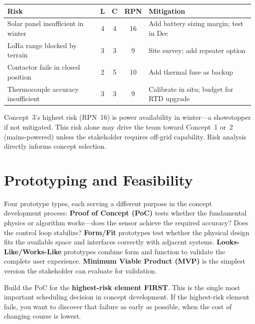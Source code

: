 \documentclass[11pt,letterpaper,twoside,openany]{book}
\begin{document}
\begin{keyconceptbox}
\begin{center}
\small
\begin{tabularx}{\textwidth}{X c c c l}
\toprule
\textbf{Risk} & \textbf{L} & \textbf{C} & \textbf{RPN} & \textbf{Mitigation} \\
\midrule
Solar panel insufficient in winter & 4 & 4 & 16 & Add battery sizing margin; test in Dec \\
LoRa range blocked by terrain & 3 & 3 & 9 & Site survey; add repeater option \\
Contactor fails in closed position & 2 & 5 & 10 & Add thermal fuse as backup \\
Thermocouple accuracy insufficient & 3 & 3 & 9 & Calibrate in situ; budget for RTD upgrade \\
\bottomrule
\end{tabularx}
\end{center}

Concept~3's highest risk (RPN~16) is power availability in winter---a showstopper if not mitigated. This risk alone may drive the team toward Concept~1 or~2 (mains-powered) unless the stakeholder requires off-grid capability. Risk analysis directly informs concept selection.
\end{keyconceptbox}

\FloatBarrier
\section{Prototyping and Feasibility}
Four prototype types, each serving a different purpose in the concept development process: \textbf{Proof of Concept (PoC)} tests whether the fundamental physics or algorithm works---does the sensor achieve the required accuracy? Does the control loop stabilize? \textbf{Form/Fit} prototypes test whether the physical design fits the available space and interfaces correctly with adjacent systems. \textbf{Looks-Like/Works-Like} prototypes combine form and function to validate the complete user experience. \textbf{Minimum Viable Product (MVP)} is the simplest version the stakeholder can evaluate for validation.

Build the PoC for the \textbf{highest-risk element FIRST}. This is the single most important scheduling decision in concept development. If the highest-risk element fails, you want to discover that failure as early as possible, when the cost of changing course is lowest.
\end{document}
